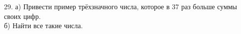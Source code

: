 29. а) Привести пример трёхзначного числа, которое в 37 раз больше суммы своих цифр.\\
б) Найти все такие числа.\\
